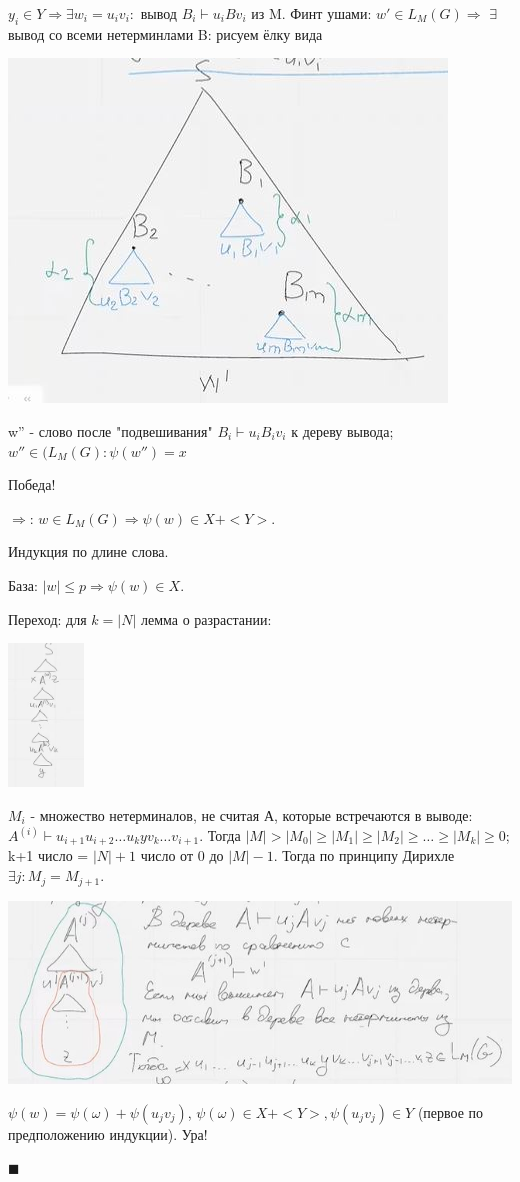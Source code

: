 $y_i \in Y \Rightarrow \exists w_i = u_iv_i:$ вывод $B_i \vdash u_iBv_i$ из M. Финт ушами: $w' \in L_M(G) \Rightarrow$ $\exists$ вывод со всеми нетерминлами B: рисуем ёлку вида

\includegraphics[]{images/new_year_tree.JPG}

w'' - слово после "подвешивания" $B_i \vdash u_iB_iv_i$ к дереву вывода; $w'' \in (L_M(G): \psi(w'') = x$

Победа!

$\Rightarrow$: $w \in L_M(G) \Rightarrow \psi(w) \in X + <Y>$.

Индукция по длине слова.

База: $|w| \leqslant p \Rightarrow \psi(w) \in X$.

Переход: для $k = |N|$ лемма о разрастании:

\includegraphics[width=2cm]{images/parikh4.JPG}

$M_i$ - множество нетерминалов, не считая А, которые встречаются в выводе: $A^{(i)} \vdash u_{i+1}u_{i+2} \dots u_k y v_k \dots v_{i+1}$. Тогда $|M| > |M_0| \geqslant |M_1| \geqslant |M_2| \geqslant \dots \geqslant |M_k| \geqslant 0$; k+1 число = $|N| + 1$ число от 0 до $|M| - 1$. Тогда по принципу Дирихле $\exists j: M_j = M_{j+1}$.

\includegraphics[]{images/parikh5.JPG}

$\psi(w) = \psi(\omega) + \psi(u_jv_j)$, $\psi(\omega) \in X + <Y>, \psi(u_jv_j) \in Y$ (первое по предположению индукции). Ура!

$\blacksquare$
